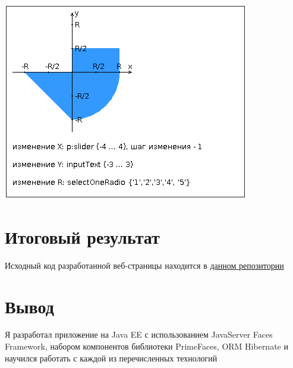 \documentclass[12pt,a4paper]{report}
\begin{document}
\begin{center}
    \includegraphics*{graph.png}
\end{center}
\section*{Итоговый результат}
Исходный код разработанной веб-страницы находится в \href{https://github.com/Armemius/ItmoStuff/tree/main/web/lab3}{данном репозитории} \\
\section*{Вывод}
Я разработал приложение на Java EE с использованием JavaServer Faces Framework, набором компонентов библиотеки PrimeFaces, ORM Hibernate и научился работать с каждой из перечисленных технологий
\end{document}
